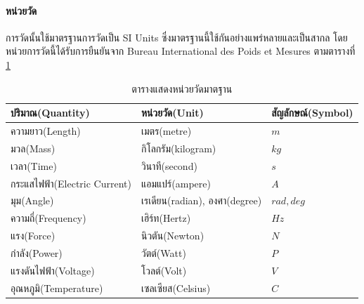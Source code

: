 \paragraph*{หน่วยวัด}
การวัดนั้นใช้มาตรฐานการวัดเป็น SI Units ซึ่งมาตรฐานนี้ใช้กันอย่างแพร่หลายและเป็นสากล โดยหน่วยการวัดนี้ได้รับการยืนยันจาก
Bureau International des Poids et Mesures ตามตารางที่ \ref{tab:standart_unit}

\begin{table}[!ht]
	\centering
	\begin{tabular}{| l | l | l |}
		\hline
		ปริมาณ(Quantity)                     & หน่วยวัด(Unit)                      & สัญลักษณ์(Symbol) \\
		\hline
		ความยาว(Length)                    & เมตร(metre)                                 & $m$                                 \\
		มวล(Mass)                                  & กิโลกรัม(kilogram)                  & $kg$                                \\
		เวลา(Time)                               & วินาที(second)                          & $s$                                 \\
		กระแสไฟฟ้า(Electric Current) & แอมแปร์(ampere)                       & $A$                                 \\
		มุม(Angle)                                 & เรเดียน(radian), องศา(degree) & $rad, deg$                          \\
		ความถี่(Frequency)                 & เฮิร์ท(Hertz)                           & $Hz$                                \\
		แรง(Force)                                 & นิวตัน(Newton)                          & $N$                                 \\
		กำลัง(Power)                           & วัตต์(Watt)                               & $P$                                 \\
		แรงดันไฟฟ้า(Voltage)       & โวลต์(Volt)                               & $V$                                 \\
		อุณหภูมิ(Temperature)            & เซลเซียส(Celsius)                   & $C$                                 \\
		\hline
	\end{tabular}
	\caption{ตารางแสดงหน่วยวัดมาตฐาน}
	\label{tab:standart_unit}
\end{table}

